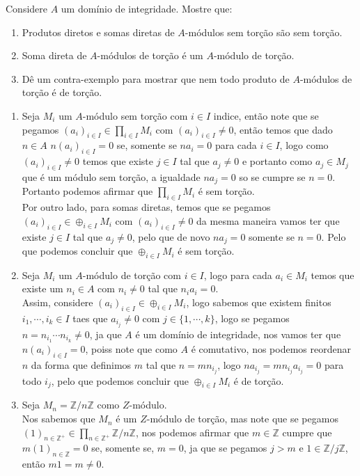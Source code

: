 \begin{homeworkProblem}[4]
  Considere $A$ um domínio de integridade. Mostre que:
  \begin{enumerate}
    \item Produtos diretos e somas diretas de $A$-módulos sem torção são sem torção.
    \item Soma direta de $A$-módulos de torção é um $A$-módulo de torção.
    \item Dê um contra-exemplo para mostrar que nem todo produto de $A$-módulos de torção é de torção.
  \end{enumerate}
  \begin{solution}
  \begin{enumerate}
    \item Seja $M_i$ um $A$-módulo sem torção com $i\in I$ indice, então note que se pegamos $(a_i)_{i\in I}\in \prod_{i\in I}M_i$ com $(a_i)_{i\in I}\neq 0$, então temos que dado $n\in A$ $n(a_i)_{i\in I}=0$ se, somente se $na_i=0$ para cada $i\in I$, logo como $(a_i)_{i\in I}\neq 0$ temos que existe $j\in I$ tal que $a_j\neq 0$ e portanto como $a_j\in M_j$ que é um módulo sem torção, a igualdade $na_j=0$ so se cumpre se $n=0$. Portanto podemos afirmar que $\prod_{i\in I}M_i$ é sem torção.\\
      Por outro lado, para somas diretas, temos que se pegamos $(a_i)_{i\in I}\in \oplus_{i\in I}M_i$ com $(a_i)_{i\in I}\neq 0$ da mesma maneira vamos ter que existe $j\in I$ tal que $a_j\neq 0$, pelo que de novo $na_j=0$ somente se $n=0$. Pelo que podemos concluir que $\oplus_{i\in I}M_i$ é sem torção.
    \item Seja $M_i$ um $A$-módulo de torção com $i\in I$, logo para cada $a_i\in M_i$ temos que existe um $n_i\in A$ com $n_i\neq 0$ tal que $n_ia_i=0$.\\
      Assim, considere $(a_i)_{i\in I}\in\oplus_{i\in I}M_i$, logo sabemos que existem finitos $i_{1},\cdots,i_k\in I$ taes que $a_{i_j}\neq 0$ com $j\in\{1,\cdots,k\}$, logo se pegamos $n=n_{i_1}\cdots n_{i_k}\neq 0$, ja que $A$ é um domínio de  integridade, nos vamos ter que $n(a_i)_{i\in I}=0$, poiss note que como $A$ é comutativo, nos podemos reordenar $n$ da forma que definimos $m$ tal que $n=mn_{i_j}$, logo $na_{i_j}=mn_{i_j}a_{i_j}=0$ para todo $i_{j}$, pelo que podemos concluir que $\oplus_{i\in I}M_i$ é de torção.
    \item Seja $M_n=\mathbb{Z}/n\mathbb{Z}$ como $Z$-módulo.\\
      Nos sabemos que $M_n$ é um $Z$-módulo de torção, mas note que se pegamos $(1)_{n\in\mathbb{Z}^{+}}\in \prod_{n\in\mathbb{Z}^{+}} \mathbb{Z}/n\mathbb{Z}$, nos podemos afirmar que $m\in \mathbb{Z}$ cumpre que $m(1)_{n\in\mathbb{Z}}=0$ se, somente se, $m=0$, ja que se pegamos $j>m$ e $1\in \mathbb{Z}/j\mathbb{Z}$, então $m1=m\neq 0$. 
  \end{enumerate}
  \end{solution}
\end{homeworkProblem}
